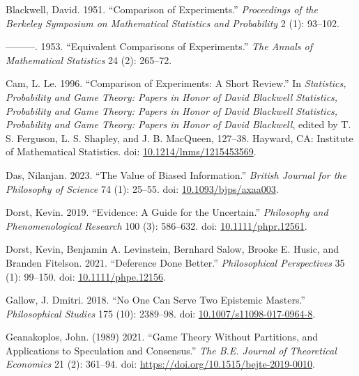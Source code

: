 \documentclass[
  10pt,
  letterpaper,
  DIV=11,
  numbers=noendperiod,
  twoside]{scrartcl}
\newlength{\cslhangindent}
\newenvironment{CSLReferences}[2] %
 {\begin{list}{}{%
  \setlength{\itemindent}{0pt}
  \setlength{\leftmargin}{0pt}
  \setlength{\parsep}{0pt}
  \ifodd #1
   \setlength{\leftmargin}{\cslhangindent}
   \setlength{\itemindent}{-1\cslhangindent}
  \fi
  \setlength{\itemsep}{#2\baselineskip}}}
 {\end{list}}
\begin{document}
\label{refs}
\begin{CSLReferences}{1}{0}
Blackwell, David. 1951. {``Comparison of Experiments.''}
\emph{Proceedings of the Berkeley Symposium on Mathematical Statistics
and Probability} 2 (1): 93--102.

---------. 1953. {``Equivalent Comparisons of Experiments.''} \emph{The
Annals of Mathematical Statistics} 24 (2): 265--72.

Cam, L. Le. 1996. {``Comparison of Experiments: A Short Review.''} In
\emph{Statistics, Probability and Game Theory: Papers in Honor of David
Blackwell Statistics, Probability and Game Theory: Papers in Honor of
David Blackwell Statistics, Probability and Game Theory: Papers in Honor
of David Blackwell}, edited by T. S. Ferguson, L. S. Shapley, and J. B.
MacQueen, 127--38. Hayward, CA: Institute of Mathematical Statistics.
doi:
\href{https://doi.org/10.1214/lnms/1215453569}{10.1214/lnms/1215453569}.

Das, Nilanjan. 2023. {``The Value of Biased Information.''}
\emph{British Journal for the Philosophy of Science} 74 (1): 25--55.
doi: \href{https://doi.org/10.1093/bjps/axaa003}{10.1093/bjps/axaa003}.

Dorst, Kevin. 2019. {``Evidence: A Guide for the Uncertain.''}
\emph{Philosophy and Phenomenological Research} 100 (3): 586--632. doi:
\href{https://doi.org/10.1111/phpr.12561}{10.1111/phpr.12561}.

Dorst, Kevin, Benjamin A. Levinstein, Bernhard Salow, Brooke E. Husic,
and Branden Fitelson. 2021. {``Deference Done Better.''}
\emph{Philosophical Perspectives} 35 (1): 99--150. doi:
\href{https://doi.org/10.1111/phpe.12156}{10.1111/phpe.12156}.

Gallow, J. Dmitri. 2018. {``No One Can Serve Two Epistemic Masters.''}
\emph{Philosophical Studies} 175 (10): 2389--98. doi:
\href{https://doi.org/10.1007/s11098-017-0964-8}{10.1007/s11098-017-0964-8}.

Geanakoplos, John. (1989) 2021. {``Game Theory Without Partitions, and
Applications to Speculation and Consensus.''} \emph{The B.E. Journal of
Theoretical Economics} 21 (2): 361--94. doi:
\url{https://doi.org/10.1515/bejte-2019-0010}.


\end{CSLReferences}
\end{document}
